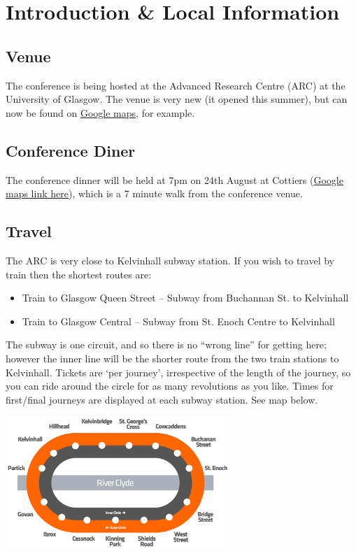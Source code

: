\documentclass{ConferenceBooklet}
\author{Ross Paterson}
\theoremstyle{definition}
\begin{document}
\maketitle

\section*{Introduction \& Local Information}
\subsection*{Venue}
The conference is being hosted at the Advanced Research Centre (ARC) at the University of Glasgow.  The venue is very new (it opened this summer), but can now be found on \href{https://goo.gl/maps/ibBpC53hhvSWkdeQ7}{Google maps}, for example.
\subsection*{Conference Diner}
The conference dinner will be held at 7pm on 24th August at Cottiers (\href{https://goo.gl/maps/q1pxzEJ8YV2ZNNCu5}{Google maps link here}), which is a 7 minute walk from the conference venue.

\subsection*{Travel}
The ARC is very close to Kelvinhall subway station.  If you wish to travel by train then the shortest routes are:
\begin{itemize}
    \item Train to Glasgow Queen Street -- Subway from Buchannan St. to Kelvinhall
    \item Train to Glasgow Central -- Subway from St. Enoch Centre to Kelvinhall
\end{itemize}
The subway is one circuit, and so there is no ``wrong line'' for getting here; however the inner line will be the shorter route from the two train stations to Kelvinhall.  Tickets are `per journey', irrespective of the length of the journey, so you can ride around the circle for as many revolutions as you like.  Times for first/final journeys are displayed at each subway station. See map below.

\vspace{10pt}
\begin{center}\includegraphics[height=5cm]{img/Glasgow_Subway_map.png}\end{center}
\vspace{10pt}
\end{document}
